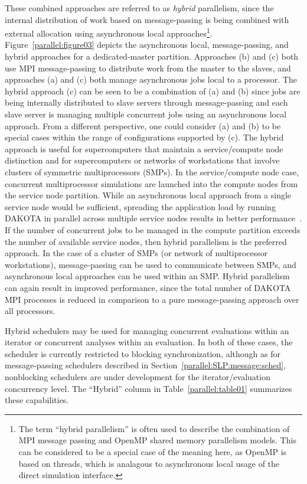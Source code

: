 These combined approaches are referred to as \emph{hybrid}
parallelism, since the internal distribution of work based on
message-passing is being combined with external allocation using
asynchronous local approaches\footnote{The term ``hybrid parallelism''
is often used to describe the combination of MPI message passing and
OpenMP shared memory parallelism models.  This can be considered to be
a special case of the meaning here, as OpenMP is based on threads,
which is analagous to asynchronous local usage of the direct
simulation interface.}.  Figure~\ref{parallel:figure03} depicts the
asynchronous local, message-passing, and hybrid approaches for a
dedicated-master partition. Approaches (b) and (c) both use MPI
message-passing to distribute work from the master to the slaves, and
approaches (a) and (c) both manage asynchronous jobs local to a
processor. The hybrid approach (c) can be seen to be a combination of
(a) and (b) since jobs are being internally distributed to slave
servers through message-passing and each slave server is managing
multiple concurrent jobs using an asynchronous local approach. From a
different perspective, one could consider (a) and (b) to be special
cases within the range of configurations supported by (c). The hybrid
approach is useful for supercomputers that maintain a service/compute
node distinction and for supercomputers or networks of workstations
that involve clusters of symmetric multiprocessors (SMPs). In the
service/compute node case, concurrent multiprocessor simulations are
launched into the compute nodes from the service node partition. While
an asynchronous local approach from a single service node would be
sufficient, spreading the application load by running DAKOTA in
parallel across multiple service nodes results in better
performance~\cite{Eld00}. If the number of concurrent jobs to be
managed in the compute partition exceeds the number of available
service nodes, then hybrid parallelism is the preferred approach. In
the case of a cluster of SMPs (or network of multiprocessor
workstations), message-passing can be used to communicate between
SMPs, and asynchronous local approaches can be used within an
SMP. Hybrid parallelism can again result in improved performance,
since the total number of DAKOTA MPI processes is reduced in
comparison to a pure message-passing approach over all processors.

Hybrid schedulers may be used for managing concurrent evaluations
within an iterator or concurrent analyses within an evaluation.  In
both of these cases, the scheduler is currently restricted to blocking
synchronization, although as for message-passing schedulers described
in Section~\ref{parallel:SLP:message:sched}, nonblocking schedulers
are under development for the iterator/evaluation concurrency level.
The ``Hybrid'' column in Table~\ref{parallel:table01} summarizes these
capabilities.


